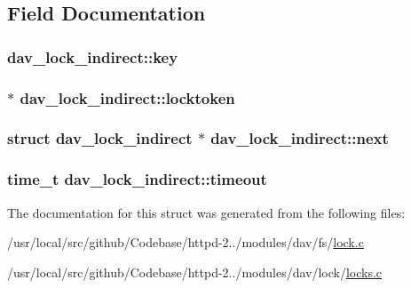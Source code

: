 \subsection{Field Documentation}
\subsubsection[{\texorpdfstring{key}{key}}]{ dav\+\_\+lock\+\_\+indirect\+::key}\hypertarget{structdav__lock__indirect_abf684cdfb59c80339403a61d4c2531ad}{}\label{structdav__lock__indirect_abf684cdfb59c80339403a61d4c2531ad}
\subsubsection[{\texorpdfstring{locktoken}{locktoken}}]{ $\ast$ dav\+\_\+lock\+\_\+indirect\+::locktoken}\hypertarget{structdav__lock__indirect_a3f4cf8c52208ee225fbe681253e5532d}{}\label{structdav__lock__indirect_a3f4cf8c52208ee225fbe681253e5532d}
\subsubsection[{\texorpdfstring{next}{next}}]{\setlength{\rightskip}{0pt plus 5cm}struct {\bf dav\+\_\+lock\+\_\+indirect} $\ast$ dav\+\_\+lock\+\_\+indirect\+::next}\hypertarget{structdav__lock__indirect_afc97fa975666d34ae4a623e6f19bbad9}{}\label{structdav__lock__indirect_afc97fa975666d34ae4a623e6f19bbad9}
\subsubsection[{\texorpdfstring{timeout}{timeout}}]{\setlength{\rightskip}{0pt plus 5cm}time\+\_\+t dav\+\_\+lock\+\_\+indirect\+::timeout}\hypertarget{structdav__lock__indirect_a9b9cee4033908cc1b16f33bd4b7223ed}{}\label{structdav__lock__indirect_a9b9cee4033908cc1b16f33bd4b7223ed}


The documentation for this struct was generated from the following files\+:\begin{DoxyCompactItemize}
\item 
/usr/local/src/github/\+Codebase/httpd-\/2../modules/dav/fs/\hyperlink{lock_8c}{lock.\+c}\item 
/usr/local/src/github/\+Codebase/httpd-\/2../modules/dav/lock/\hyperlink{locks_8c}{locks.\+c}\end{DoxyCompactItemize}
